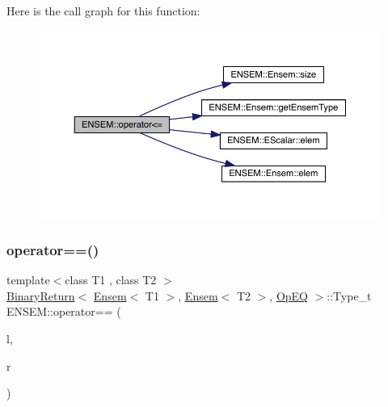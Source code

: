 Here is the call graph for this function\+:\nopagebreak
\begin{figure}[H]
\begin{center}
\leavevmode
\includegraphics[width=350pt]{d1/d9e/group__eensem_ga876b949826dc1335f76b3b4e1c32b076_cgraph}
\end{center}
\end{figure}
\mbox{\label{group__eensem_ga8f2413d9b23131f67cbe4d3bd222e0ec}} 
\subsubsection{\texorpdfstring{operator==()}{operator==()}\hspace{0.1cm}{\footnotesize\ttfamily [1/3]}}
{\footnotesize\ttfamily template$<$class T1 , class T2 $>$ \\
\mbox{\hyperlink{structENSEM_1_1BinaryReturn}{Binary\+Return}}$<$ \mbox{\hyperlink{classENSEM_1_1Ensem}{Ensem}}$<$ T1 $>$, \mbox{\hyperlink{classENSEM_1_1Ensem}{Ensem}}$<$ T2 $>$, \mbox{\hyperlink{structENSEM_1_1OpEQ}{Op\+EQ}} $>$\+::Type\+\_\+t E\+N\+S\+E\+M\+::operator== (\begin{DoxyParamCaption}\item[{const \mbox{\hyperlink{classENSEM_1_1Ensem}{Ensem}}$<$ T1 $>$ \&}]{l,  }\item[{const \mbox{\hyperlink{classENSEM_1_1Ensem}{Ensem}}$<$ T2 $>$ \&}]{r }\end{DoxyParamCaption})\hspace{0.3cm}{\ttfamily [inline]}}

